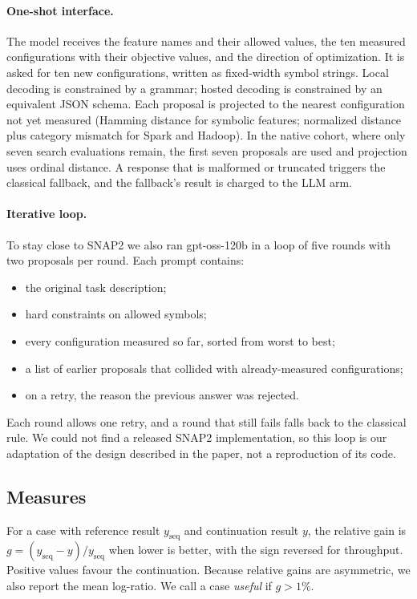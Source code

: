 \paragraph{One-shot interface.} The model receives the feature names and their allowed values, the ten measured configurations with their objective values, and the direction of optimization. It is asked for ten new configurations, written as fixed-width symbol strings. Local decoding is constrained by a grammar; hosted decoding is constrained by an equivalent JSON schema. Each proposal is projected to the nearest configuration not yet measured (Hamming distance for symbolic features; normalized distance plus category mismatch for Spark and Hadoop). In the native cohort, where only seven search evaluations remain, the first seven proposals are used and projection uses ordinal distance. A response that is malformed or truncated triggers the classical fallback, and the fallback's result is charged to the LLM arm.

\paragraph{Iterative loop.} To stay close to SNAP2 we also ran gpt-oss-120b in a loop of five rounds with two proposals per round. Each prompt contains:
\begin{itemize}
  \item the original task description;
  \item hard constraints on allowed symbols;
  \item every configuration measured so far, sorted from worst to best;
  \item a list of earlier proposals that collided with already-measured configurations;
  \item on a retry, the reason the previous answer was rejected.
\end{itemize}
Each round allows one retry, and a round that still fails falls back to the classical rule. We could not find a released SNAP2 implementation, so this loop is our adaptation of the design described in the paper, not a reproduction of its code.

\subsection{Measures}

For a case with reference result $y_{\mathrm{seq}}$ and continuation result $y$, the relative gain is $g = (y_{\mathrm{seq}} - y)/y_{\mathrm{seq}}$ when lower is better, with the sign reversed for throughput. Positive values favour the continuation. Because relative gains are asymmetric, we also report the mean log-ratio. We call a case \emph{useful} if $g > 1\%$.

